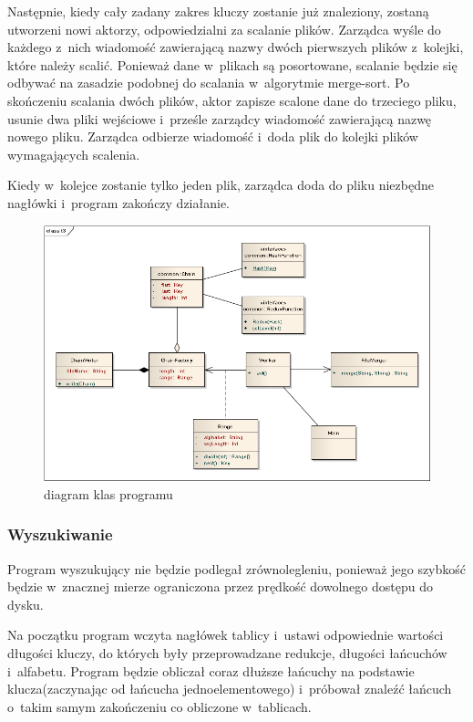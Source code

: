 \documentclass[a4paper]{scrartcl}
\begin{document}
Następnie, kiedy cały zadany zakres kluczy zostanie już znaleziony, zostaną utworzeni nowi aktorzy, odpowiedzialni za scalanie plików.
Zarządca wyśle do każdego z~nich wiadomość zawierającą nazwy dwóch pierwszych plików z~kolejki, które należy scalić.
Ponieważ dane w~plikach są posortowane, scalanie będzie się odbywać na zasadzie podobnej do scalania w~algorytmie merge-sort.
Po skończeniu scalania dwóch plików, aktor zapisze scalone dane do trzeciego pliku, usunie dwa pliki wejściowe i~prześle zarządcy wiadomość zawierającą nazwę nowego pliku.
Zarządca odbierze wiadomość i~doda plik do kolejki plików wymagających scalenia.

Kiedy w~kolejce zostanie tylko jeden plik, zarządca doda do pliku niezbędne nagłówki i~program zakończy działanie.

\begin{figure}
\begin{center}
\includegraphics[width=\textwidth]{t3.png}
\end{center}
\caption{diagram klas programu \ttt}
\end{figure}


\subsubsection{Wyszukiwanie}
Program wyszukujący nie będzie podlegał zrównolegleniu, ponieważ jego szybkość będzie w~znacznej mierze ograniczona przez prędkość dowolnego dostępu do dysku.

Na początku program wczyta nagłówek tablicy i~ustawi odpowiednie wartości długości kluczy, do których były przeprowadzane redukcje, długości łańcuchów i~alfabetu.
Program będzie obliczał coraz dłuższe łańcuchy na podstawie klucza(zaczynając od łańcucha jednoelementowego) i~próbował znaleźć łańcuch o~takim samym zakończeniu co obliczone w~tablicach.
\end{document}
